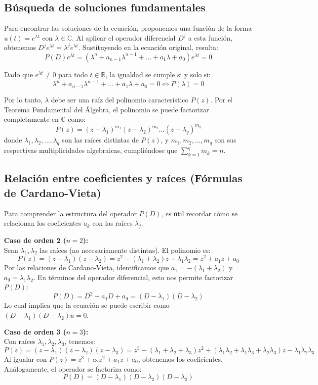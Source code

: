 \subsection{Búsqueda de soluciones fundamentales}

Para encontrar las soluciones de la ecuación, proponemos una función de la forma $u(t) = e^{\lambda t}$ con $\lambda \in \mathbb{C}$. Al aplicar el operador diferencial $D^j$ a esta función, obtenemos $D^j e^{\lambda t} = \lambda^j e^{\lambda t}$. Sustituyendo en la ecuación original, resulta:
\[
    P(D)e^{\lambda t} = (\lambda^n + a_{n-1} \lambda^{n-1} + \dots + a_1 \lambda + a_0) e^{\lambda t} = 0
\]

Dado que $e^{\lambda t} \neq 0$ para todo $t \in \mathbb{R}$, la igualdad se cumple si y solo si:
\[
    \lambda^n + a_{n-1} \lambda^{n-1} + \dots + a_1 \lambda + a_0 = 0 \iff P(\lambda) = 0
\]

Por lo tanto, $\lambda$ debe ser una raíz del polinomio característico $P(z)$. Por el Teorema Fundamental del Álgebra, el polinomio se puede factorizar completamente en $\mathbb{C}$ como:
\[
    P(z) = (z - \lambda_1)^{m_1} (z - \lambda_2)^{m_2} \dots (z - \lambda_q)^{m_q}
\]
donde $\lambda_1, \lambda_2, \dots, \lambda_q$ son las raíces distintas de $P(z)$, y $m_1, m_2, \dots, m_q$ son sus respectivas multiplicidades algebraicas, cumpliéndose que $\sum_{k=1}^q m_k = n$.

\subsection{Relación entre coeficientes y raíces (Fórmulas de Cardano-Vieta)}

Para comprender la estructura del operador $P(D)$, es útil recordar cómo se relacionan los coeficientes $a_k$ con las raíces $\lambda_j$. 

\textbf{Caso de orden 2 ($n=2$):}\\
Sean $\lambda_1, \lambda_2$ las raíces (no necesariamente distintas). El polinomio es:
\[
    P(z) = (z - \lambda_1)(z - \lambda_2) = z^2 - (\lambda_1 + \lambda_2)z + \lambda_1 \lambda_2 = z^2 + a_1 z + a_0
\]
Por las relaciones de Cardano-Vieta, identificamos que $a_1 = -(\lambda_1 + \lambda_2)$ y $a_0 = \lambda_1 \lambda_2$.
En términos del operador diferencial, esto nos permite factorizar $P(D)$:
\[
    P(D) = D^2 + a_1 D + a_0 = (D - \lambda_1)(D - \lambda_2)
\]
Lo cual implica que la ecuación se puede escribir como $(D-\lambda_1)(D-\lambda_2) u = 0$.

\textbf{Caso de orden 3 ($n=3$):}\\
Con raíces $\lambda_1, \lambda_2, \lambda_3$, tenemos:
\[
    P(z) = (z - \lambda_1)(z - \lambda_2)(z - \lambda_3) = z^3 - (\lambda_1 + \lambda_2 + \lambda_3) z^2 + (\lambda_1 \lambda_2 + \lambda_1 \lambda_3 + \lambda_2 \lambda_3) z - \lambda_1 \lambda_2 \lambda_3
\]
Al igualar con $P(z) = z^3 + a_2 z^2 + a_1 z + a_0$, obtenemos los coeficientes. Análogamente, el operador se factoriza como:
\[
    P(D) = (D - \lambda_1)(D - \lambda_2)(D - \lambda_3)
\]

